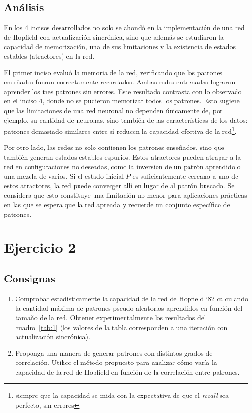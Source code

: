 \documentclass[11pt]{article} %
\begin{document}
\clearpage
\newpage

\subsection{Análisis}

En los 4 incisos desarrollados no solo se ahondó en la implementación de una red de Hopfield con actualización sincrónica, sino que además se estudiaron la capacidad de memorización, una de sus limitaciones y la existencia de estados estables (atractores) en la red. 

El primer inciso evaluó la memoria de la red, verificando que los patrones enseñados fueran correctamente recordados. Ambas redes entrenadas lograron aprender los tres patrones  sin errores. Este resultado contrasta con lo observado en el inciso 4, donde no se pudieron memorizar todos los patrones. Esto sugiere que las limitaciones de una red neuronal no dependen únicamente de, por ejemplo, su cantidad de neuronas, sino también de las características de los datos: patrones demasiado similares entre sí reducen la capacidad efectiva de la red\footnote{siempre que la capacidad se mida con la expectativa de que el \textit{recall} sea perfecto, sin errores}.

Por otro lado, las redes no solo contienen los patrones enseñados, sino que también generan estados estables espurios. Estos atractores pueden atrapar a la red en configuraciones no deseadas, como la inversión de un patrón aprendido o una mezcla de varios.   Si el estado inicial $P$ es suficientemente cercano a uno de estos atractores, la red puede converger allí en lugar de al patrón buscado. Se considera que esto constituye una limitación no menor para aplicaciones prácticas en las que se espera que la red aprenda y recuerde un conjunto específico de patrones. 

\clearpage
\newpage

\section{Ejercicio 2}

\subsection{Consignas}
\begin{enumerate}[label=\alph*]
\item Comprobar estadísticamente la capacidad de la red de Hopfield ‘82 calculando la
cantidad máxima de patrones pseudo-aleatorios aprendidos en función del tamaño
de la red. Obtener experimentalmente los resultados del cuadro~\ref{tab:1} (los
valores de la tabla corresponden a una iteración con actualización sincrónica).
\item Proponga una manera de generar patrones con distintos grados de correlación.
Utilice el método propuesto para analizar cómo varía la capacidad de la red de
Hopfield en función de la correlación entre patrones.
\end{enumerate}
\end{document}
